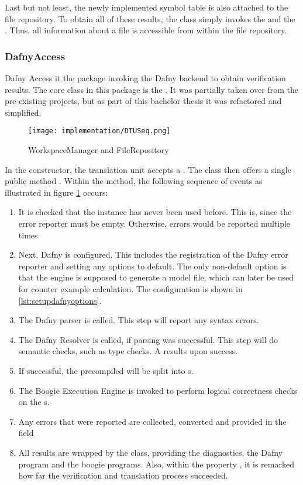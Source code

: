 Last but not least, the newly implemented symbol table is also attached to the file repository.
To obtain all of these results, the class simply invokes the  and the .
Thus, all information about a file is accessible from within the file repository.


\subsubsection{DafnyAccess}
Dafny Access it the package invoking the Dafny backend to obtain verification results.
The core class in this package is the .
It was partially taken over from the pre-existing projects, but as part of this bachelor thesis it was refactored and simplified.\\

\begin{figure}[h]
    \centering
    \texttt{[image: implementation/DTUSeq.png]}
    \caption{WorkspaceManager and FileRepository}
    \label{fig:DTUSeq}
\end{figure}

In the constructor, the translation unit accepts a .
The class then offers a single public method .
Within the method, the following sequence of events as illustrated in figure \ref{fig:DTUSeq} occurs:

\begin{enumerate}
    \item It is checked that the instance has never been used before.
    This is, since the error reporter must be empty.
    Otherwise, errors would be reported multiple times.
    \item Next, Dafny is configured.
    This includes the registration of the Dafny error reporter and setting any options to default.
    The only non-default option is that the engine is supposed to generate a model file, which can later be used for counter example calculation.
    The configuration is shown in \ref{lst:setupdafnyoptions}.
    \item The Dafny parser is called.
    This step will report any syntax errors.
    \item The Dafny Resolver is called, if parsing was successful.
    This step will do semantic checks, such as type checks.
    A  results upon success.
    \item If successful, the precompiled  will be split into s.
    \item The Boogie Execution Engine is invoked to perform logical correctness checks on the s.
    \item Any errors that were reported are collected, converted and provided in the field 
    \item All results are wrapped by the  class, providing the diagnostics, the Dafny program and the boogie programs.
    Also, within the property , it is remarked how far the verification and translation process succeeded.
\end{enumerate}


